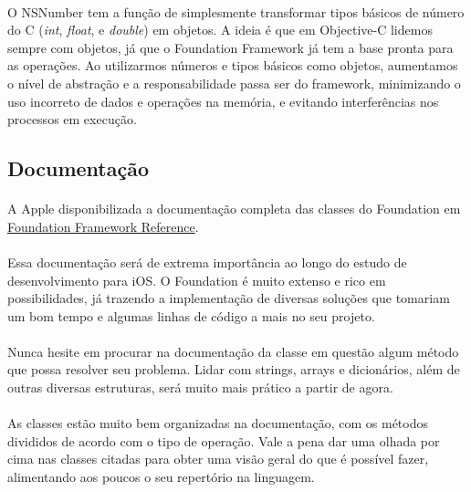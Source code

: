 \documentclass[a4paper,12pt,brazil,doubleside]{book}
\begin{document}
\paragraph{}O NSNumber tem a função de simplesmente transformar tipos básicos de número do C (\emph{int}, \emph{float}, e \emph{double}) em objetos. A ideia é que em Objective-C lidemos sempre com objetos, já que o Foundation Framework já tem a base pronta para as operações. Ao utilizarmos números e tipos básicos como objetos, aumentamos o nível de abstração e a responsabilidade passa ser do framework, minimizando o uso incorreto de dados e operações na memória, e evitando interferências nos processos em execução.

\bigskip

\subsection{Documentação}

\paragraph{}A Apple disponibilizada a documentação completa das classes do Foundation em
\href{http://developer.apple.com/library/ios/#documentation/Cocoa/Reference/Foundation/ObjC_classic/_index.html}{Foundation Framework Reference}.
\paragraph{}Essa documentação será de extrema importância ao longo do estudo de desenvolvimento para iOS. O Foundation é muito extenso e rico em possibilidades, já trazendo a implementação de diversas soluções que tomariam um bom tempo e algumas linhas de código a mais no seu projeto.
\paragraph{}Nunca hesite em procurar na documentação da classe em questão algum método que possa resolver seu problema. Lidar com strings, arrays e dicionários, além de outras diversas estruturas, será muito mais prático a partir de agora.
\paragraph{}As classes estão muito bem organizadas na documentação, com os métodos divididos de acordo com o tipo de operação. Vale a pena dar uma olhada por cima nas classes citadas para obter uma visão geral do que é possível fazer, alimentando aos poucos o seu repertório na linguagem.
\end{document}
